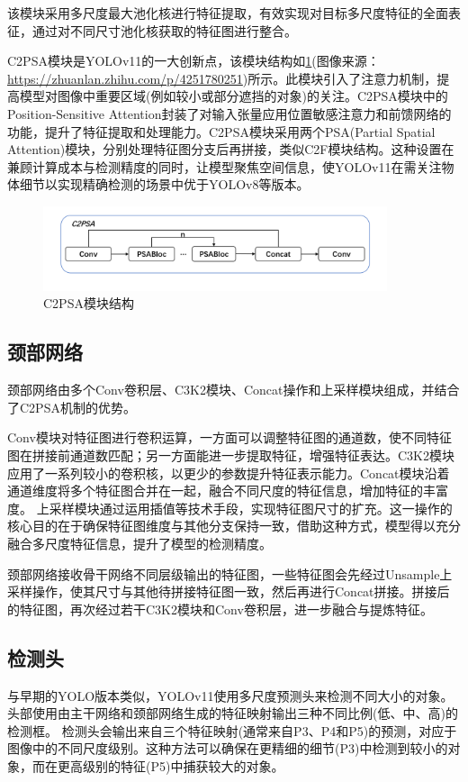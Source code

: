 该模块采用多尺度最大池化核进行特征提取，有效实现对目标多尺度特征的全面表征，通过对不同尺寸池化核获取的特征图进行整合。

C2PSA模块是YOLOv11的一大创新点，该模块结构如\ref{fig:c2psa}(图像来源：\url{https://zhuanlan.zhihu.com/p/4251780251})所示。此模块引入了注意力机制，提高模型对图像中重要区域(例如较小或部分遮挡的对象)的关注。C2PSA模块中的Position-Sensitive Attention封装了对输入张量应用位置敏感注意力和前馈网络的功能，提升了特征提取和处理能力。C2PSA模块采用两个PSA(Partial Spatial Attention)模块，分别处理特征图分支后再拼接，类似C2F模块结构。这种设置在兼顾计算成本与检测精度的同时，让模型聚焦空间信息，使YOLOv11在需关注物体细节以实现精确检测的场景中优于YOLOv8等版本。

\begin{figure}[!htb]
  \centering
  \includegraphics[width=0.9\textwidth]{figs/chap02/c2psa.png}
  \caption{C2PSA模块结构}
  \label{fig:c2psa}
\end{figure}

\subsection{颈部网络}
颈部网络由多个Conv卷积层、C3K2模块、Concat操作和上采样模块组成，并结合了C2PSA机制的优势。

Conv模块对特征图进行卷积运算，一方面可以调整特征图的通道数，使不同特征图在拼接前通道数匹配；另一方面能进一步提取特征，增强特征表达。C3K2模块应用了一系列较小的卷积核，以更少的参数提升特征表示能力。Concat模块沿着通道维度将多个特征图合并在一起，融合不同尺度的特征信息，增加特征的丰富度。
上采样模块通过运用插值等技术手段，实现特征图尺寸的扩充。这一操作的核心目的在于确保特征图维度与其他分支保持一致，借助这种方式，模型得以充分融合多尺度特征信息，提升了模型的检测精度。

颈部网络接收骨干网络不同层级输出的特征图，一些特征图会先经过Unsample上采样操作，使其尺寸与其他待拼接特征图一致，然后再进行Concat拼接。拼接后的特征图，再次经过若干C3K2模块和Conv卷积层，进一步融合与提炼特征。

\subsection{检测头}
与早期的YOLO版本类似，YOLOv11使用多尺度预测头来检测不同大小的对象。头部使用由主干网络和颈部网络生成的特征映射输出三种不同比例(低、中、高)的检测框。
检测头会输出来自三个特征映射(通常来自P3、P4和P5)的预测，对应于图像中的不同尺度级别。这种方法可以确保在更精细的细节(P3)中检测到较小的对象，而在更高级别的特征(P5)中捕获较大的对象​。

